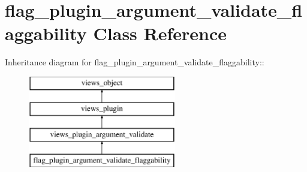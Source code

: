 \hypertarget{classflag__plugin__argument__validate__flaggability}{
\section{flag\_\-plugin\_\-argument\_\-validate\_\-flaggability Class Reference}
\label{classflag__plugin__argument__validate__flaggability}
}
Inheritance diagram for flag\_\-plugin\_\-argument\_\-validate\_\-flaggability::\begin{figure}[H]
\begin{center}
\leavevmode
\includegraphics[height=4cm]{classflag__plugin__argument__validate__flaggability}
\end{center}
\end{figure}
